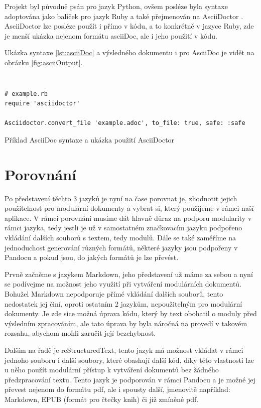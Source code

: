 Projekt byl původně psán pro jazyk Python, ovšem posléze byla syntaxe adoptována jako balíček pro jazyk Ruby a také přejmenován na AsciiDoctor \cite{asciiDoctorSW}. AsciiDoctor lze posléze
použít i přímo v kódu, a to konkrétně v jazyce Ruby, zde je menší ukázka nejenom formátu asciiDoc, ale i jeho použití v kódu.

Ukázka syntaxe \ref{lst:asciiDoc} a výsledného dokumentu i pro AsciiDoc je vidět na obrázku \ref{fig:asciiOutput}.

\begin{listing}[ht]
    \inputminted[linenos,breaklines]{text}{example-ascii.adoc}
    \inputminted[linenos,breaklines]{text}{module.adoc}
    \begin{verbatim}
# example.rb
require 'asciidoctor'

Asciidoctor.convert_file 'example.adoc', to_file: true, safe: :safe
    \end{verbatim}
    \caption{Příklad AsciiDoc syntaxe a ukázka použití AsciiDoctor}
    \label{lst:asciiDoc}
\end{listing}

\clearpage

\section{Porovnání}

Po představení těchto 3 jazyků je nyní na čase porovnat je, zhodnotit jejich použitelnost pro modulární dokumenty a vybrat si, který použijeme v rámci naší aplikace.
V rámci porovnání musíme dát hlavně důraz na podporu modularity v rámci jazyka, tedy jestli je už v samostatném značkovacím jazyku podpořeno vkládání dalších
souborů s textem, tedy modulů. Dále se také zaměříme na jednoduchost generování různých formátů, některé jazyky jsou podpořeny v Pandocu a pokud jsou, do jakých
formátů je lze převést.

Prvně začněme s jazykem Markdown, jeho představení už máme za sebou a nyní se podívejme na možnost jeho využití při vytváření modulárních dokumentů. Bohužel
Markdown nepodporuje přímé vkládání dalších souborů, tento nedostatek jej činí, oproti ostatním 2 jazykům, nepoužitelným pro modulární dokumenty. Je zde sice možná úprava
kódu, který by text obohatil o moduly před výsledním zpracováním, ale tato úprava by byla náročná na provedí v takovém rozsahu, abychom mohli zaručit její bezchybnost.

Dalším na řadě je reStructuredText, tento jazyk má možnost vkládat v rámci jednoho souboru i další soubory, které obashují další kód, díky této vlastnosti
lze u něho použít modulární přístup k vytváření dokumentů bez žádného předzpracování textu. Tento jazyk je podporován v rámci Pandocu \cite{pandocSW} a je možné
jej převest nejenom do formátu \gls{pdf}, ale i spousty další, jmenovitě například: Markdown, EPUB (formát pro čtečky knih) či již zmíněné \gls{pdf}.

